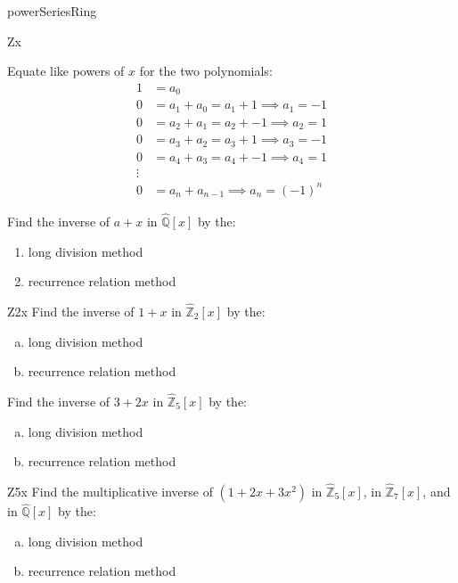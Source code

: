 \begin{example}{powerSeriesRing}
\begin{example}{Zx}
\begin{enumerate}
Equate like powers of $x$ for the two polynomials:
\begin{align*}
1&=a_0\\
0&=a_1+a_0=a_1+1\implies a_1=-1\\
0&=a_2+a_1=a_2+-1\implies a_2=1\\
0&=a_3+a_2=a_3+1\implies a_3=-1\\
0&=a_4+a_3=a_4+-1\implies a_4=1\\
\vdots\\
0&=a_n+a_{n-1}\implies a_n=(-1)^n
\end{align*}
\end{enumerate}
\end{example}

\begin{exercise}{}
Find the inverse of $a+x$ in $\widehat{{\mathbb Q}}[x]$ by the:
\begin{enumerate}
\item long division method
\item recurrence relation method
\end{enumerate}
\end{exercise}

\begin{exercise}{Z2x}
Find the inverse of $1+x$ in $ \widehat{{\mathbb Z}}_{2}[x]$ by the:
\begin{enumerate}[(a)]
\item long division method
\item recurrence relation method
\end{enumerate}
\end{exercise}

\begin{exercise}{}
Find the inverse of $3+2x$ in $ \widehat{{\mathbb Z}}_{5}[x]$ by the:
\begin{enumerate}[(a)]
\item long division method
\item recurrence relation method
\end{enumerate}
\end{exercise}

\begin{exercise}{Z5x}
Find the multiplicative inverse of $(1+2x+3x^2)$ in $ \widehat{{\mathbb Z}}_5[x]$, in $ \widehat{{\mathbb Z}}_7[x]$, and in $ \widehat{{\mathbb Q}}[x]$ by the:
\begin{enumerate}[(a)]
\item long division method
\item recurrence relation method
\end{enumerate}
\end{exercise}
\end{example}

